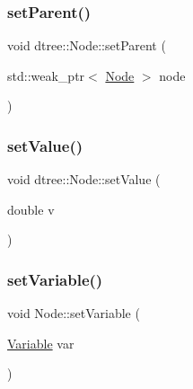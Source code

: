 \mbox{\label{classdtree_1_1_node_a37e830162fb4a08a668f843ca039f91d}} 
\subsubsection{\texorpdfstring{setParent()}{setParent()}}
{\footnotesize\ttfamily void dtree\+::\+Node\+::set\+Parent (\begin{DoxyParamCaption}\item[{std\+::weak\+\_\+ptr$<$ \mbox{\hyperlink{classdtree_1_1_node}{Node}} $>$}]{node }\end{DoxyParamCaption})\hspace{0.3cm}{\ttfamily [inline]}}

\mbox{\label{classdtree_1_1_node_aab0b6d3b5a771bb07df2c74a7a984eb1}} 
\subsubsection{\texorpdfstring{setValue()}{setValue()}}
{\footnotesize\ttfamily void dtree\+::\+Node\+::set\+Value (\begin{DoxyParamCaption}\item[{double}]{v }\end{DoxyParamCaption})\hspace{0.3cm}{\ttfamily [inline]}}

\mbox{\label{classdtree_1_1_node_ab21d7f4bf5198156bb2cb01fa449ce57}} 
\subsubsection{\texorpdfstring{setVariable()}{setVariable()}}
{\footnotesize\ttfamily void Node\+::set\+Variable (\begin{DoxyParamCaption}\item[{\mbox{\hyperlink{namespacedtree_a79fe30831a14df904319f9e783b3189b}{Variable}}}]{var }\end{DoxyParamCaption})}

\mbox{\label{classdtree_1_1_node_a3f065f365c3a7ec0a2371070df16a680}} 
